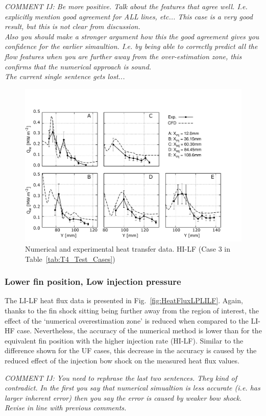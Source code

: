 \documentclass{AIAA}
\begin{document}
{\it COMMENT IJ: Be more positive. Talk about the features that agree well. I.e. explicitly mention good agreement for ALL lines, etc... This case is a very good result, but this is not clear from discussion.\\
Also you should make a stronger argument how this the good agreement gives you confidence for the earlier simaultion. I.e. by being able to correctly predict all the flow features when you are further away from the over-estimation zone, this confirms that the numerical approach is sound.\\
The current single sentence gets lost...}


%
\begin{figure}[!h]
\center
\includegraphics[trim = 0mm 3mm 25mm 25mm, clip, width=0.60\columnwidth,valign=t,fbox]{Figures/Data/LP_HI_LF/GNUP_CFD_GaugesLines_Multi.pdf}
\caption{Numerical and experimental heat transfer data. HI-LF (Case 3 in Table~\ref{tab:T4_Test_Cases})}
\label{fig:HeatFluxLPHILF}
\end{figure} 


\subsubsection{Lower fin position, Low injection pressure}
 
The LI-LF heat flux data is presented in Fig.~\ref{fig:HeatFluxLPLILF}.
Again, thanks to the fin shock sitting being further away from the region of interest, the effect of the `numerical overestimation zone' is reduced when compared to the LI-HF case.
Nevertheless, the accuracy of the numerical method is lower than for the equivalent fin position with the higher injection rate (HI-LF).
Similar to the difference shown for the UF cases, this decrease in the accuracy is caused by the reduced effect of the injection bow shock on the measured heat flux values.

{\it COMMENT IJ: You need to rephrase the last two sentences. They kind of contradict. In the first you say that numerical simualtion is less accurate (i.e. has larger inherent error) then you say the error is caused by weaker bow shock.\\
Revise in line with previous comments.} 
\end{document}

